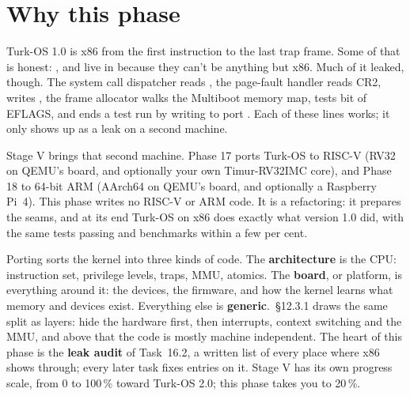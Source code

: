 \documentclass[11pt,a4paper]{article}
\begin{document}
\renewcommand{\progresslabel}{Stage V progress toward Turk-OS 2.0 (this phase in red)}


\section{Why this phase}

Turk-OS 1.0 is x86 from the first instruction to the last trap frame. Some of that is honest: ,
 and  live in  because they can't be anything but x86. Much of it
leaked, though. The system call dispatcher reads , the page-fault handler reads CR2,  writes
, the frame allocator walks the Multiboot memory map,  tests bit  of
EFLAGS, and  ends a test run by writing to port . Each of these lines works; it only shows up as
a leak on a second machine.

Stage V brings that second machine. Phase 17 ports Turk-OS to RISC-V (RV32 on QEMU's  board, and optionally
your own Timur-RV32IMC core), and Phase 18 to 64-bit ARM (AArch64 on QEMU's  board, and optionally a
Raspberry Pi~4). This phase writes no RISC-V or ARM code. It is a refactoring: it prepares the seams, and at its end
Turk-OS on x86 does exactly what version 1.0 did, with the same tests passing and benchmarks within a few per cent.

Porting sorts the kernel into three kinds of code. The \textbf{architecture} is the CPU: instruction set, privilege
levels, traps, MMU, atomics. The \textbf{board}, or platform, is everything around it: the devices, the firmware, and
how the kernel learns what memory and devices exist. Everything else is \textbf{generic}. \MOS\,\S12.3.1 draws the
same split as layers: hide the hardware first, then interrupts, context switching and the MMU, and above that the code
is mostly machine independent. The heart of this phase is the \textbf{leak audit} of Task~16.2, a written list of
every place where x86 shows through; every later task fixes entries on it. Stage V has its own progress scale, from 0
to 100\,\% toward Turk-OS 2.0; this phase takes you to 20\,\%.
\end{document}
